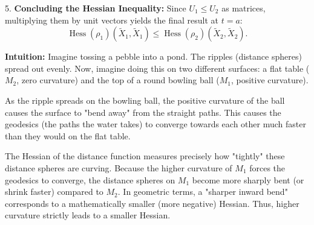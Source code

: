 \begin{solution}
5. \textbf{Concluding the Hessian Inequality:}
Since $U_1 \le U_2$ as matrices, multiplying them by unit vectors yields the final result at $t=a$:
\[ \operatorname{Hess}(\rho_1)(\tilde{X}_1, \tilde{X}_1) \le \operatorname{Hess}(\rho_2)(\tilde{X}_2, \tilde{X}_2). \]
\par\vspace{\baselineskip}

\textbf{Intuition:}
Imagine tossing a pebble into a pond. The ripples (distance spheres) spread out evenly. Now, imagine doing this on two different surfaces: a flat table ($M_2$, zero curvature) and the top of a round bowling ball ($M_1$, positive curvature).
\par\vspace{\baselineskip}

As the ripple spreads on the bowling ball, the positive curvature of the ball causes the surface to "bend away" from the straight paths. This causes the geodesics (the paths the water takes) to converge towards each other much faster than they would on the flat table.
\par\vspace{\baselineskip}

The Hessian of the distance function measures precisely how "tightly" these distance spheres are curving. Because the higher curvature of $M_1$ forces the geodesics to converge, the distance spheres on $M_1$ become more sharply bent (or shrink faster) compared to $M_2$. In geometric terms, a "sharper inward bend" corresponds to a mathematically smaller (more negative) Hessian. Thus, higher curvature strictly leads to a smaller Hessian.
\end{solution}
